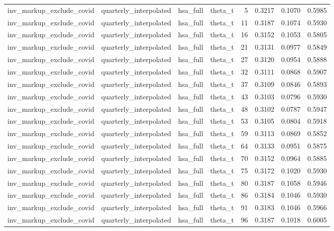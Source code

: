 \begin{tabular}{llllrrrr}
inv\_markup\_exclude\_covid & quarterly\_interpolated & hsa\_full & theta\_t & 5 & 0.3217 & 0.1070 & 0.5985 \\
inv\_markup\_exclude\_covid & quarterly\_interpolated & hsa\_full & theta\_t & 11 & 0.3187 & 0.1074 & 0.5930 \\
inv\_markup\_exclude\_covid & quarterly\_interpolated & hsa\_full & theta\_t & 16 & 0.3152 & 0.1053 & 0.5805 \\
inv\_markup\_exclude\_covid & quarterly\_interpolated & hsa\_full & theta\_t & 21 & 0.3131 & 0.0977 & 0.5849 \\
inv\_markup\_exclude\_covid & quarterly\_interpolated & hsa\_full & theta\_t & 27 & 0.3120 & 0.0954 & 0.5888 \\
inv\_markup\_exclude\_covid & quarterly\_interpolated & hsa\_full & theta\_t & 32 & 0.3111 & 0.0868 & 0.5907 \\
inv\_markup\_exclude\_covid & quarterly\_interpolated & hsa\_full & theta\_t & 37 & 0.3109 & 0.0846 & 0.5893 \\
inv\_markup\_exclude\_covid & quarterly\_interpolated & hsa\_full & theta\_t & 43 & 0.3103 & 0.0796 & 0.5930 \\
inv\_markup\_exclude\_covid & quarterly\_interpolated & hsa\_full & theta\_t & 48 & 0.3102 & 0.0787 & 0.5947 \\
inv\_markup\_exclude\_covid & quarterly\_interpolated & hsa\_full & theta\_t & 53 & 0.3105 & 0.0804 & 0.5918 \\
inv\_markup\_exclude\_covid & quarterly\_interpolated & hsa\_full & theta\_t & 59 & 0.3113 & 0.0869 & 0.5852 \\
inv\_markup\_exclude\_covid & quarterly\_interpolated & hsa\_full & theta\_t & 64 & 0.3133 & 0.0951 & 0.5875 \\
inv\_markup\_exclude\_covid & quarterly\_interpolated & hsa\_full & theta\_t & 70 & 0.3152 & 0.0964 & 0.5885 \\
inv\_markup\_exclude\_covid & quarterly\_interpolated & hsa\_full & theta\_t & 75 & 0.3172 & 0.1020 & 0.5930 \\
inv\_markup\_exclude\_covid & quarterly\_interpolated & hsa\_full & theta\_t & 80 & 0.3187 & 0.1058 & 0.5946 \\
inv\_markup\_exclude\_covid & quarterly\_interpolated & hsa\_full & theta\_t & 86 & 0.3184 & 0.1046 & 0.5930 \\
inv\_markup\_exclude\_covid & quarterly\_interpolated & hsa\_full & theta\_t & 91 & 0.3183 & 0.1046 & 0.5966 \\
inv\_markup\_exclude\_covid & quarterly\_interpolated & hsa\_full & theta\_t & 96 & 0.3187 & 0.1018 & 0.6005 \\

\end{tabular}
